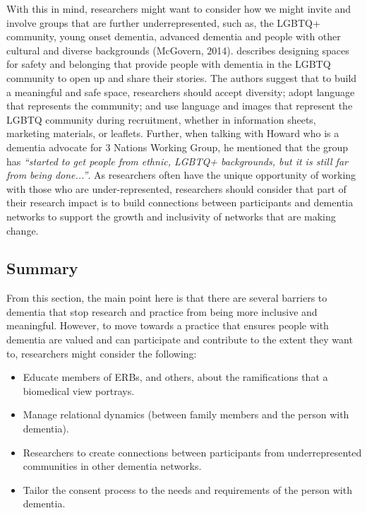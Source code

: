 With this in mind, researchers might want to consider how we might invite and involve groups that are further underrepresented, such as, the LGBTQ+ community, young onset dementia, advanced dementia and people with other cultural and diverse backgrounds \citep{foley_struggle_2019, bryden_before_2015} (McGovern, 2014). \cite{mcgovern2014forgotten} describes designing spaces for safety and belonging that provide people with dementia in the LGBTQ community to open up and share their stories. The authors suggest that to build a meaningful and safe space, researchers should accept diversity; adopt language that represents the community; and use language and images that represent the LGBTQ community during recruitment, whether in information sheets, marketing materials, or leaflets. Further, when talking with Howard who is a dementia advocate for 3 Nations Working Group, he mentioned that the group has \textit{``started to get people from ethnic, LGBTQ+ backgrounds, but it is still far from being done...''}. As researchers often have the unique opportunity of working with those who are under-represented, researchers should consider that part of their research impact is to build connections between participants and dementia networks to support the growth and inclusivity of networks that are making change. 

\subsection{Summary}
\label{EthicsSummary}
From this section, the main point here is that there are several barriers to dementia that stop research and practice from being more inclusive and meaningful. However, to move towards a practice that ensures people with dementia are valued and can participate and contribute to the extent they want to, researchers might consider the following:
\begin{itemize}
    \item Educate members of ERBs, and others, about the ramifications that a biomedical view portrays.
    \item Manage relational dynamics (between family members and the person with dementia).
    \item Researchers to create connections between participants from underrepresented communities in other dementia networks.
    \item Tailor the consent process to the needs and requirements of the person with dementia.
\end{itemize}

